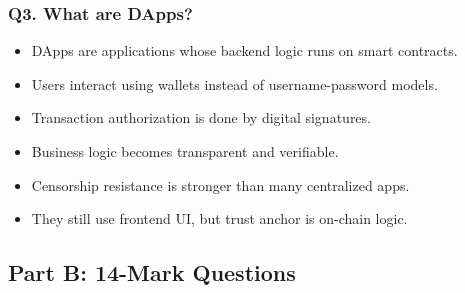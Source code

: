 \documentclass[12pt,a4paper]{article}
\begin{document}
\subsubsection*{Q3. What are DApps?}
\begin{itemize}
\item DApps are applications whose backend logic runs on smart contracts.
\item Users interact using wallets instead of username-password models.
\item Transaction authorization is done by digital signatures.
\item Business logic becomes transparent and verifiable.
\item Censorship resistance is stronger than many centralized apps.
\item They still use frontend UI, but trust anchor is on-chain logic.
\end{itemize}

\subsection{Part B: 14-Mark Questions}
\end{document}
